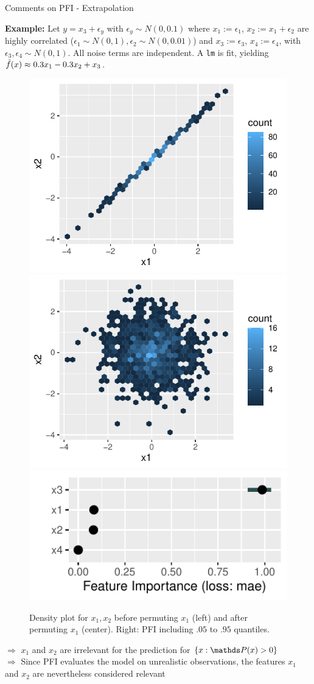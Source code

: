 \documentclass[11pt,compress,t,notes=noshow, aspectratio=169, xcolor=table]{beamer}
\begin{document}
\begin{vbframe}{Comments on PFI - Extrapolation}
 
 \textbf{Example:} Let $y = x_3 + \epsilon_y$ with $\epsilon_y \sim N(0, 0.1)$ where $x_1 :=  \epsilon_1$, $x_2 := x_1 + \epsilon_2$ are highly correlated ($\epsilon_1 \sim N(0,1), \epsilon_2 \sim N(0, 0.01)$) and $x_3 := \epsilon_3$, $x_4 := \epsilon_4$,  with $\epsilon_3, \epsilon_4 \sim N(0,1)$. All noise terms are independent.
A \texttt{lm} is fit, yielding $\fh(x) \approx 0.3 x_1 - 0.3 x_2 + x_3$.\\
\begin{figure}
\hfill
  \includegraphics[width=0.25\linewidth]{figure_man/pfi_hexbin_pre.pdf}\hfill
  \includegraphics[width=0.25\linewidth]{figure_man/pfi_hexbin_post.pdf} \hfill
  \includegraphics[width=0.4\linewidth]{figure_man/pfi_extrapolation.pdf} \hfill
  \caption{Density plot for $x_1, x_2$ before permuting $x_1$ (left) and after permuting $x_1$ (center). Right: PFI including $.05$ to $.95$ quantiles.}
\end{figure}
% 
$\Rightarrow$ $x_1$ and $x_2$ are irrelevant for the prediction for $\{x: \P(x) > 0\}$ \\
$\Rightarrow$ Since PFI evaluates the model on unrealistic observations, the features $x_1$ and $x_2$ are nevertheless considered relevant

 \end{vbframe}
\end{document}
